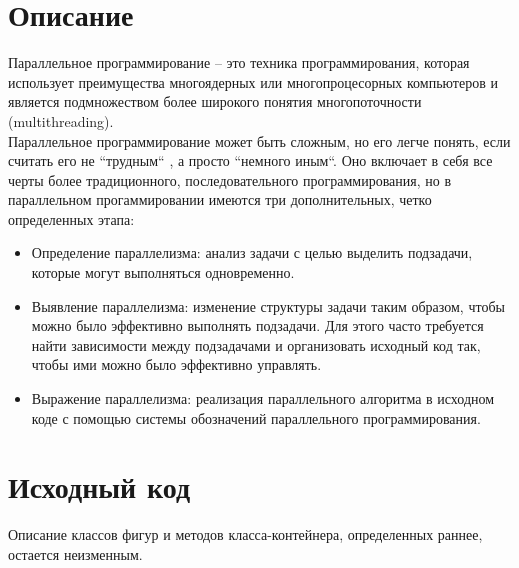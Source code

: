 \section{Описание}

Параллельное программирование -- это техника программирования, которая использует преимущества многоядерных или многопроцесорных компьютеров и является подмножеством более широкого понятия многопоточности (multithreading). \\
Параллельное программирование может быть сложным, но его легче понять, если считать его не ``трудным`` , а просто ``немного иным``. Оно включает в себя все черты более традиционного, последовательного программирования, но в параллельном прогаммировании имеются три дополнительных, четко определенных этапа:
\begin{itemize}
\item{Определение параллелизма: анализ задачи с целью выделить подзадачи, которые могут выполняться одновременно.}
\item{Выявление параллелизма: изменение структуры задачи таким образом, чтобы можно было эффективно выполнять подзадачи. Для этого часто требуется найти зависимости между подзадачами и организовать исходный код так, чтобы ими можно было эффективно управлять.}
\item{Выражение параллелизма: реализация параллельного алгоритма в исходном коде с помощью системы обозначений параллельного программирования.}
\end{itemize}

\section{Исходный код}

Описание классов фигур и методов класса-контейнера, определенных раннее, остается неизменным.\\

